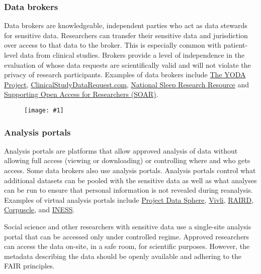 \documentclass{article}
\newlength{\imgwidth}
\newcommand\scaledgraphics[2]{%
                
\settowidth{\imgwidth}{\texttt{[image: \#1]}}%
                
\setlength{\imgwidth}{\minof{\imgwidth}{#2\textwidth}}%
                
\texttt{[image: \#1]}%
                
}
\begin{document}
\subsubsection{\textbf{Data brokers}}\label{data-brokers}



Data brokers are knowledgeable, independent parties who act as data stewards for sensitive data. Researchers can transfer their sensitive data and jurisdiction over access to that data to the broker. This is especially common with patient-level data from clinical studies. Brokers provide a level of independence in the evaluation of whose data requests are scientifically valid and will not violate the privacy of research participants. Examples of data brokers include \href{http://yoda.yale.edu/}{The YODA Project}, \href{https://www.clinicalstudydatarequest.com/}{ClinicalStudyDataRequest.com}, \href{https://sleepdata.org/}{National Sleep Research Resource} and \href{https://dcri.org/our-approach/data-sharing/}{Supporting Open Access for Researchers (SOAR)}.

\begin{figure}
\scaledgraphics{a646aeba-4f42-4f79-8e43-aa33c7f3c9bf.png}{1}
\label{F7880231}
\end{figure}


\subsubsection{\textbf{Analysis portals}}\label{analysis-portals}



Analysis portals are platforms that allow approved analysis of data without allowing full access (viewing or downloading) or controlling where and who gets access. Some data brokers also use analysis portals. Analysis portals control what additional datasets can be pooled with the sensitive data as well as what analyses can be run to ensure that personal information is not revealed during reanalysis. Examples of virtual analysis portals include \href{https://www.projectdatasphere.org/projectdatasphere/html/home}{Project Data Sphere}, \href{http://vivli.org/}{Vivli}, \href{http://raird.no/}{RAIRD}, \href{http://clarino.uib.no/korpuskel/page}{Corpuscle}, and \href{http://clarino.uib.no/iness/page}{INESS}.


Social science and other researchers with sensitive data use a single-site analysis portal that can be accessed only under controlled regime. Approved researchers can access the data on-site, in a safe room, for scientific purposes. However, the metadata describing the data should be openly available and adhering to the FAIR principles.
\end{document}
